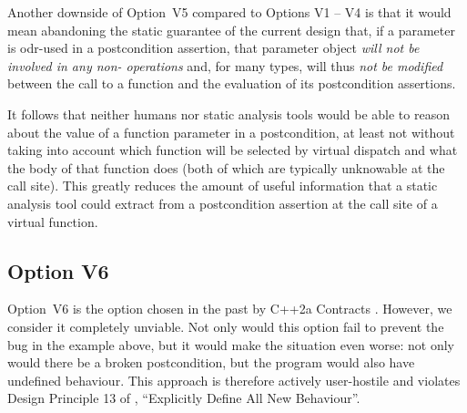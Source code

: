 Another downside of Option~V5 compared to Options V1 -- V4 is that it would mean abandoning the static guarantee of the current \cite{P2900R10} design that, if a parameter is odr-used in a postcondition assertion, that parameter object \emph{will not be involved in any non- operations} and, for many types, will thus \emph{not be modified} between the call to a function and the evaluation of its postcondition assertions.

It follows that neither humans nor static analysis tools would be able to reason about the value of a function parameter in a postcondition, at least not without taking into account which function will be selected by virtual dispatch and what the body of that function does (both of which are typically unknowable at the call site). This greatly reduces the amount of useful information that a static analysis tool could extract from a postcondition assertion at the call site of a virtual function.

\subsection*{Option V6}

Option~V6 is the option chosen in the past by C++2a Contracts \cite{P0542R5}. However, we consider it completely unviable. Not only would this option fail to prevent the bug in the example above, but it would make the situation even worse: not only would there be a broken postcondition, but the program would also have undefined behaviour. This approach is therefore actively user-hostile and violates Design Principle 13 of \cite{P2900R10}, ``Explicitly Define All New Behaviour''.


